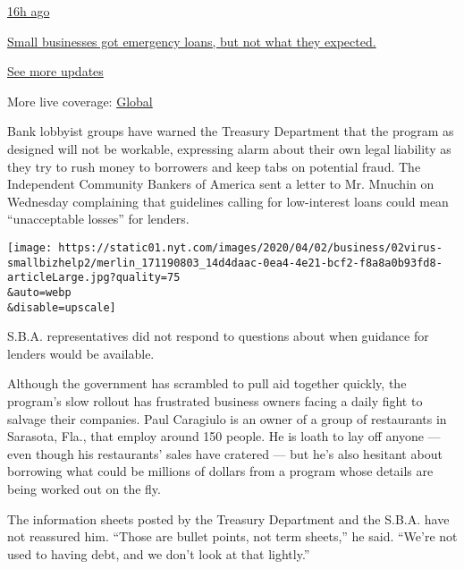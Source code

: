\href{https://www.nytimes.com/live/2020/08/03/business/stock-market-today-coronavirus?action=click\&pgtype=Article\&state=default\&region=MAIN_CONTENT_1\&context=storylines_live_updates\#small-businesses-got-emergency-loans-but-not-what-they-expected}{16h
ago}

\href{https://www.nytimes.com/live/2020/08/03/business/stock-market-today-coronavirus?action=click\&pgtype=Article\&state=default\&region=MAIN_CONTENT_1\&context=storylines_live_updates\#small-businesses-got-emergency-loans-but-not-what-they-expected}{Small
businesses got emergency loans, but not what they expected.}

\href{https://www.nytimes.com/live/2020/08/03/business/stock-market-today-coronavirus?action=click\&pgtype=Article\&state=default\&region=MAIN_CONTENT_1\&context=storylines_live_updates}{See
more updates}

More live coverage:
\href{https://www.nytimes.com/2020/08/04/world/coronavirus-covid-19.html?action=click\&pgtype=Article\&state=default\&region=MAIN_CONTENT_1\&context=storylines_live_updates}{Global}

Bank lobbyist groups have warned the Treasury Department that the
program as designed will not be workable, expressing alarm about their
own legal liability as they try to rush money to borrowers and keep tabs
on potential fraud. The Independent Community Bankers of America sent a
letter to Mr. Mnuchin on Wednesday complaining that guidelines calling
for low-interest loans could mean ``unacceptable losses'' for lenders.

\texttt{[image: https://static01.nyt.com/images/2020/04/02/business/02virus-smallbizhelp2/merlin\_171190803\_14d4daac-0ea4-4e21-bcf2-f8a8a0b93fd8-articleLarge.jpg?quality=75\\\&auto=webp\\\&disable=upscale]}

S.B.A. representatives did not respond to questions about when guidance
for lenders would be available.

Although the government has scrambled to pull aid together quickly, the
program's slow rollout has frustrated business owners facing a daily
fight to salvage their companies. Paul Caragiulo is an owner of a group
of restaurants in Sarasota, Fla., that employ around 150 people. He is
loath to lay off anyone --- even though his restaurants' sales have
cratered --- but he's also hesitant about borrowing what could be
millions of dollars from a program whose details are being worked out on
the fly.

The information sheets posted by the Treasury Department and the S.B.A.
have not reassured him. ``Those are bullet points, not term sheets,'' he
said. ``We're not used to having debt, and we don't look at that
lightly.''

